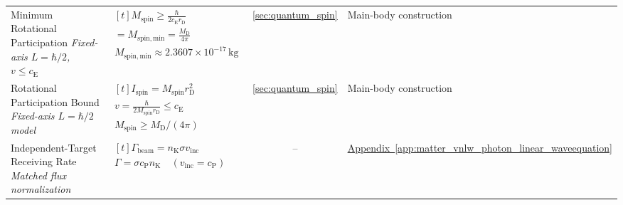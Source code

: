 \begin{longtable}{@{} p{4.5cm} p{6cm} c p{4cm} @{}}
{\raggedright Minimum Rotational Participation \newline \textit{Fixed-axis $L=\hbar/2$, $v\leq c_{\mathrm E}$}\par} & {\raggedright $\begin{gathered}[t]M_{\mathrm{spin}}\geq\frac{\hbar}{2c_{\mathrm E}r_{\mathrm D}} \\ =M_{\mathrm{spin,min}}=\frac{M_{\mathrm D}}{4\pi} \\ M_{\mathrm{spin,min}}\approx2.3607\times10^{-17}\,\mathrm{kg}\end{gathered}$\par} & \hyperref[sec:quantum_spin]{\ref*{sec:quantum_spin}} & {\raggedright Main-body construction\par} \\

{\raggedright Rotational Participation Bound \newline \textit{Fixed-axis $L=\hbar/2$ model}\par} & {\raggedright $\begin{gathered}[t]I_{\mathrm{spin}}=M_{\mathrm{spin}}r_{\mathrm D}^2 \\ v=\frac{\hbar}{2M_{\mathrm{spin}}r_{\mathrm D}}\leq c_{\mathrm E} \\ M_{\mathrm{spin}}\geq M_{\mathrm D}/(4\pi)\end{gathered}$\par} & \hyperref[sec:quantum_spin]{\ref*{sec:quantum_spin}} & {\raggedright Main-body construction\par} \\

{\raggedright Independent-Target Receiving Rate \newline \textit{Matched flux normalization}\par} & {\raggedright $\begin{gathered}[t]\Gamma_{\mathrm{beam}}=n_{\mathrm K}\sigma v_{\mathrm{inc}} \\ \Gamma=\sigma c_{\mathrm P}n_{\mathrm K}\quad(v_{\mathrm{inc}}=c_{\mathrm P})\end{gathered}$\par} & -- & {\raggedright \hyperref[app:matter_vnlw_photon_linear_waveequation]{Appendix~\ref*{app:matter_vnlw_photon_linear_waveequation}}\par} \\


\end{longtable}
